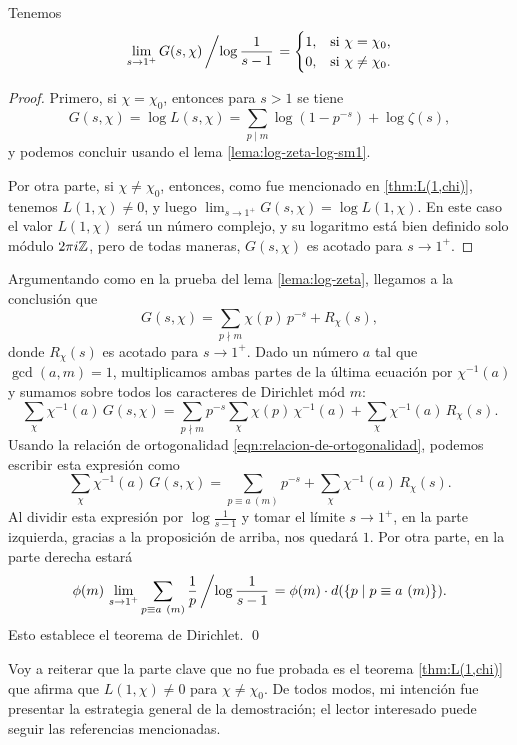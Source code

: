 \begin{proposicion}
  Tenemos
  \[ \lim_{s\to 1^+} G (s,\chi)\left/\log \frac{1}{s-1}\right. =
  \begin{cases}
    1, & \text{si } \chi = \chi_0, \\
    0, & \text{si } \chi \ne \chi_0.
  \end{cases} \]

  \begin{proof}
    Primero, si $\chi = \chi_0$, entonces para $s > 1$ se tiene
    \[ G (s,\chi) = \log L (s,\chi) =
    \sum_{p\mid m} \log (1 - p^{-s}) + \log \zeta (s), \]
    y podemos concluir usando el lema \ref{lema:log-zeta-log-sm1}.

    Por otra parte, si $\chi \ne \chi_0$, entonces, como fue mencionado en
    \ref{thm:L(1,chi)}, tenemos $L (1,\chi) \ne 0$, y luego
    $\lim_{s\to 1^+} G (s,\chi) = \log L (1,\chi)$. En este caso el valor
    $L (1,\chi)$ será un número complejo, y su logaritmo está bien definido solo
    módulo $2\pi i \mathbb{Z}$, pero de todas maneras, $G (s,\chi)$ es acotado para
    $s \to 1^+$.
  \end{proof}
\end{proposicion}

Argumentando como en la prueba del lema \ref{lema:log-zeta}, llegamos a la
conclusión que
$$G (s,\chi) = \sum_{p \nmid m} \chi (p)\,p^{-s} + R_\chi (s),$$
donde $R_\chi (s)$ es acotado para $s \to 1^+$. Dado un número $a$ tal que
$\gcd (a,m) = 1$, multiplicamos ambas partes de la última ecuación por
$\chi^{-1} (a)$ y sumamos sobre todos los caracteres de Dirichlet mód $m$:
$$\sum_\chi \chi^{-1} (a)\,G (s,\chi) = \sum_{p \nmid m} p^{-s} \sum_\chi \chi (p)\,\chi^{-1} (a) + \sum_\chi \chi^{-1} (a)\,R_\chi (s).$$
Usando la relación de ortogonalidad \eqref{eqn:relacion-de-ortogonalidad},
podemos escribir esta expresión como
$$\sum_\chi \chi^{-1} (a)\,G (s,\chi) = \sum_{p \equiv a ~ (m)} p^{-s} + \sum_\chi \chi^{-1} (a)\,R_\chi (s).$$
Al dividir esta expresión por $\log \frac{1}{s-1}$ y tomar el límite
$s \to 1^+$, en la parte izquierda, gracias a la proposición de arriba, nos
quedará $1$. Por otra parte, en la parte derecha estará
$$\phi (m)\,\lim_{s\to 1^+} \sum_{p \equiv a ~ (m)} \frac{1}{p} \left/\log \frac{1}{s-1}\right. = \phi (m) \cdot d (\{ p \mid p \equiv a ~ (m) \}).$$
Esto establece el teorema de Dirichlet. \qed

\vspace{1em}

Voy a reiterar que la parte clave que no fue probada es el teorema
\ref{thm:L(1,chi)} que afirma que $L (1,\chi) \ne 0$ para $\chi \ne \chi_0$.
De todos modos, mi intención fue presentar la estrategia general de
la demostración; el lector interesado puede seguir las referencias mencionadas.

